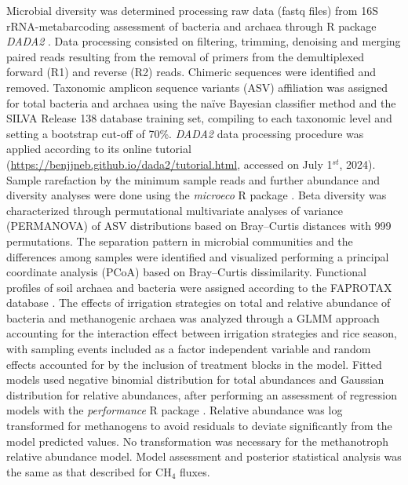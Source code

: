 Microbial diversity was determined processing raw data (fastq files) from 16S rRNA-metabarcoding assessment of bacteria and archaea through R package \textit{DADA2} \citep{callahan10high}. Data processing consisted on filtering, trimming, denoising and merging paired reads resulting from the removal of primers from the demultiplexed forward (R1) and reverse (R2) reads. Chimeric sequences were identified and removed. Taxonomic amplicon sequence variants (ASV) affiliation was assigned for total bacteria and archaea using the naïve Bayesian classifier method \citep{wang2007} and the SILVA Release 138 database training set, compiling to each taxonomic level and setting a bootstrap cut-off of 70\%. \textit{DADA2} data processing procedure was applied according to its online tutorial (\url{https://benjjneb.github.io/dada2/tutorial.html}, accessed on July 1$^{st}$, 2024). Sample rarefaction by the minimum sample reads and further abundance and diversity analyses were done using the \textit{microeco} R package \citep{liu2021microeco}. Beta diversity was characterized through permutational multivariate analyses of variance (PERMANOVA) of ASV distributions based on Bray–Curtis distances with 999 permutations. The separation pattern in microbial communities and the differences among samples were identified and visualized performing a principal coordinate analysis (PCoA) based on Bray–Curtis dissimilarity. Functional profiles of soil archaea and bacteria were assigned according to the FAPROTAX database \citep{louca2016decoupling}. 
The effects of irrigation strategies on total and relative abundance of bacteria and methanogenic archaea was analyzed through a GLMM approach accounting for the interaction effect between irrigation strategies and rice season, with sampling events included as a factor independent variable and random effects accounted for by the inclusion of treatment blocks in the model. Fitted models used negative binomial distribution for total abundances and Gaussian distribution for relative abundances, after performing an assessment of regression models with the \textit{performance} R package \citep{ludecke2021performance}. Relative abundance was log transformed for methanogens to avoid residuals to deviate significantly from the model predicted values. No transformation was necessary for the methanotroph relative abundance model. Model assessment and posterior statistical analysis was the same as that described for CH$_{4}$ fluxes.\\ 

